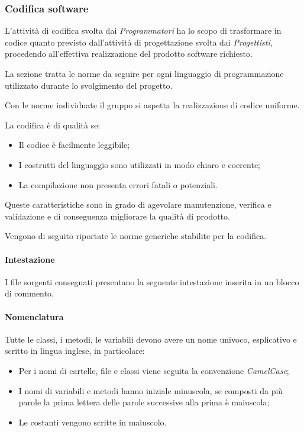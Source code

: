 \subsubsection{Codifica software}
L'attività di codifica svolta dai \textit{Programmatori} ha lo scopo di trasformare in codice quanto previsto dall'attività di progettazione svolta dai \textit{Progettisti}, procedendo all'effettiva realizzazione del prodotto software richiesto.

La sezione tratta le norme da seguire per ogni linguaggio di programmazione utilizzato durante lo svolgimento del progetto.

Con le norme individuate il gruppo si aspetta la realizzazione di codice uniforme.

La codifica è di qualità se: 
\begin{itemize}
	\item Il codice è facilmente leggibile;
	\item I costrutti del linguaggio sono utilizzati in modo chiaro e coerente;
	\item La compilazione non presenta errori fatali o potenziali.
\end{itemize}
Queste caratteristiche sono in grado di agevolare manutenzione, verifica e validazione e di conseguenza migliorare la qualità di prodotto.

\label{CodificaConvenzioni}Vengono di seguito riportate le norme generiche stabilite per la codifica.
\paragraph*{Intestazione}
I file sorgenti consegnati presentano la seguente intestazione inserita in un blocco di commento.
\paragraph*{Nomenclatura}
Tutte le classi, i metodi, le variabili devono avere un nome univoco, esplicativo e scritto in lingua inglese, in particolare:
\begin{itemize}
	\item Per i nomi di cartelle, file e classi viene seguita la convenzione \textit{CamelCase};
	\item I nomi di variabili e metodi hanno iniziale minuscola, se composti da più parole la prima lettera delle parole successive alla prima è maiuscola;
	\item Le costanti vengono scritte in maiuscolo.
\end{itemize}
